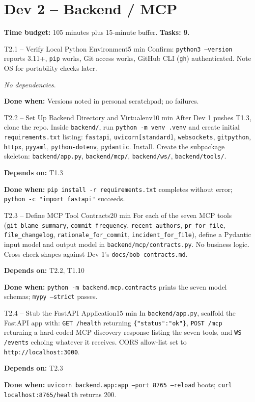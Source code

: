 \documentclass[11pt,letterpaper]{article}
\newcommand{\acceptance}[1]{\par\smallskip\textcolor{ibmgreen}{\textbf{Done when:}} #1}
\newcommand{\depends}[1]{\par\smallskip\textcolor{ibmorange}{\textbf{Depends on:}} #1}
\newcommand{\nodep}{\par\smallskip\textcolor{ibmgray}{\textit{No dependencies.}}}
\begin{document}
\section{Dev 2 -- Backend / MCP}

\textbf{Time budget:} 105 minutes plus 15-minute buffer. \textbf{Tasks: 9.}

\begin{task}{T2.1 -- Verify Local Python Environment}{5 min}
Confirm: \texttt{python3 --version} reports 3.11+, \texttt{pip} works, Git access works, GitHub CLI (\texttt{gh}) authenticated. Note OS for portability checks later.
\nodep
\acceptance{Versions noted in personal scratchpad; no failures.}
\end{task}

\begin{task}{T2.2 -- Set Up Backend Directory and Virtualenv}{10 min}
After Dev 1 pushes T1.3, clone the repo. Inside \texttt{backend/}, run \texttt{python -m venv .venv} and create initial \texttt{requirements.txt} listing: \texttt{fastapi}, \texttt{uvicorn[standard]}, \texttt{websockets}, \texttt{gitpython}, \texttt{httpx}, \texttt{pyyaml}, \texttt{python-dotenv}, \texttt{pydantic}. Install. Create the subpackage skeleton: \texttt{backend/app.py}, \texttt{backend/mcp/}, \texttt{backend/ws/}, \texttt{backend/tools/}.
\depends{T1.3}
\acceptance{\texttt{pip install -r requirements.txt} completes without error; \texttt{python -c "import fastapi"} succeeds.}
\end{task}

\begin{task}{T2.3 -- Define MCP Tool Contracts}{20 min}
For each of the seven MCP tools (\texttt{git\_blame\_summary}, \texttt{commit\_frequency}, \texttt{recent\_authors}, \texttt{pr\_for\_file}, \texttt{file\_changelog}, \texttt{rationale\_for\_commit}, \texttt{incident\_for\_file}), define a Pydantic input model and output model in \texttt{backend/mcp/contracts.py}. No business logic. Cross-check shapes against Dev 1's \texttt{docs/bob-contracts.md}.
\depends{T2.2, T1.10}
\acceptance{\texttt{python -m backend.mcp.contracts} prints the seven model schemas; \texttt{mypy --strict} passes.}
\end{task}

\begin{task}{T2.4 -- Stub the FastAPI Application}{15 min}
In \texttt{backend/app.py}, scaffold the FastAPI app with: \texttt{GET /health} returning \texttt{\{"status":"ok"\}}, \texttt{POST /mcp} returning a hard-coded MCP discovery response listing the seven tools, and \texttt{WS /events} echoing whatever it receives. CORS allow-list set to \texttt{http://localhost:3000}.
\depends{T2.3}
\acceptance{\texttt{uvicorn backend.app:app --port 8765 --reload} boots; \texttt{curl localhost:8765/health} returns 200.}
\end{task}
\end{document}
